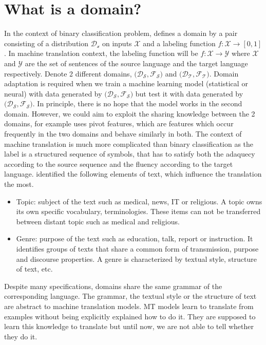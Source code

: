 \section{What is a domain?}
\label{sec:domain}
In the context of binary classification problem, \citet{Shai10A} defines a domain by a pair consisting of a distribution $\mathcal{D_x}$ on inputs $\mathcal{X}$ and a labeling function $f: \mathcal{X} \rightarrow [0,1]$. In machine translation context, the labeling function will be $f: \mathcal{X} \rightarrow \mathcal{Y}$ where $\mathcal{X}$ and $\mathcal{Y}$ are the set of sentences of the source language and the target language respectively. Denote 2 different domains, $\big( \mathcal{D_S}, \mathcal{F_S} \big)$ and $\big( \mathcal{D_T}, \mathcal{F_T} \big)$. Domain adaptation is required when we train a machine learning model (statistical or neural) with data generated by $\big(\mathcal{D_S}, \mathcal{F_S} \big)$ but test it with data generated by $\big(\mathcal{D_S}, \mathcal{F_S} \big)$. In principle, there is no hope that the model works in the second domain. However, we could aim to exploit the sharing knowledge between the 2 domains, for example \citet{Blitzer06Domain} uses pivot features, which are features which occur frequently in the two domains and behave similarly in both. The context of machine translation is much more complicated than binary classification as the label is a structured sequence of symbols, that has to satisfy both the adaquecy according to the source sequence and the fluency according to the target language. \cite{Wees15Whats,Wees17Whats} identified the following elements of text, which influence the translation the most.
\begin{itemize}
	\item Topic: subject of the text such as medical, news, IT or religious. A topic owns its own specific vocabulary, terminologies. These items can not be transferred between distant topic such as medical and religious.
	\item Genre: purpose of the text such as education, talk, report or instruction. It identifies groups of texts that share a common form of transmission, purpose and discourse properties. A genre is characterized by textual style, structure of text, etc.
\end{itemize}

Despite many specifications, domains share the same grammar of the corresponding language. The grammar, the textual style or the structure of text are abstract to machine translation models. MT models learn to translate from examples without being explicitly explained how to do it. They are supposed to learn this knowledge to translate but until now, we are not able to tell whether they do it.

